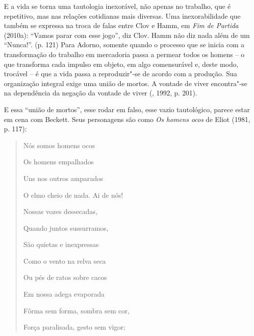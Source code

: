 E a vida se torna uma tautologia inexorável, não apenas no trabalho, que
é repetitivo, mas nas relações cotidianas mais diversas. Uma
inexorabilidade que também se expressa na troca de falas entre Clov e
Hamm, em \emph{Fim de Partida} (2010a): ``Vamos parar com esse jogo'',
diz Clov. Hamm não diz nada além de um ``Nunca!''. (p. 121) Para Adorno,
somente quando o processo que se inicia com a transformação do trabalho
em mercadoria passa a permear todos os homens -- o que transforma cada
impulso em objeto, em algo comensurável e, deste modo, trocável -- é que
a vida passa a reproduzir"-se de acordo com a produção. Sua organização
integral exige uma união de mortos. A vontade de viver encontra"-se na
dependência da negação da vontade de viver (, 1992, p. 201).

E essa ``união de mortos'', esse rodar em falso, esse vazio tautológico,
parece estar em cena com Beckett. Seus personagens são como \emph{Os
homens ocos} de Eliot (1981, p. 117):

\begin{quote}
Nós somos homens ocos

Os homens empalhados

Uns nos outros amparados

O elmo cheio de nada. Ai de nós!

Nossas vozes dessecadas,

Quando juntos sussurramos,

São quietas e inexpressas

Como o vento na relva seca

Ou pés de ratos sobre cacos

Em nossa adega evaporada

Fôrma sem forma, sombra sem cor,

Força paralisada, gesto sem vigor;
\end{quote}

